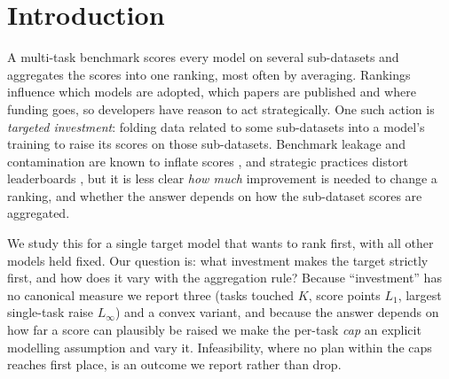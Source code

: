 \section{Introduction}
\label{sec:intro}

A multi-task benchmark scores every model on several sub-datasets and aggregates the scores into one ranking, most often by averaging.
Rankings influence which models are adopted, which papers are published and where funding goes, so developers have reason to act strategically.
One such action is \emph{targeted investment}: folding data related to some sub-datasets into a model's training to raise its scores on those sub-datasets.
Benchmark leakage and contamination are known to inflate scores \citep{zhou2023dont,yang2023rethinking}, and strategic practices distort leaderboards \citep{singh2025leaderboard}, but it is less clear \emph{how much} improvement is needed to change a ranking, and whether the answer depends on how the sub-dataset scores are aggregated.

We study this for a single target model that wants to rank first, with all other models held fixed.
Our question is: what investment makes the target strictly first, and how does it vary with the aggregation rule?
Because ``investment'' has no canonical measure we report three (tasks touched $K$, score points $L_1$, largest single-task raise $L_\infty$) and a convex variant, and because the answer depends on how far a score can plausibly be raised we make the per-task \emph{cap} an explicit modelling assumption and vary it.
Infeasibility, where no plan within the caps reaches first place, is an outcome we report rather than drop.

